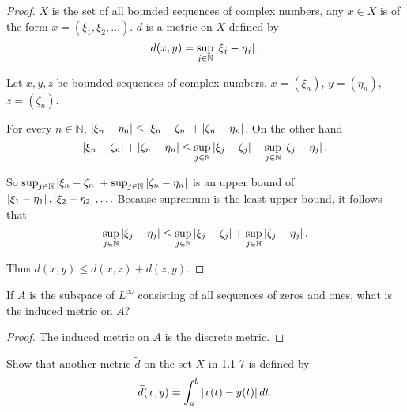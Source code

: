 \begin{proof}
    $X$ is the set of all bounded sequences of complex numbers, any $x\in X$ is of the form $x = (\xi_{1}, \xi_{2}, \ldots)$. $d$ is a metric on $X$ defined by
    \[
        d(x, y) = \sup_{j\in\mathbb{N}}\left\vert{\xi_{j} - \eta_{j}}\right\vert.
    \]

    Let $x, y, z$ be bounded sequences of complex numbers. $x = {(\xi_{n})}$, $y = {(\eta_{n})}$, $z = (\zeta_{n})$.

    For every $n\in\mathbb{N}$, $\left\vert{\xi_{n} - \eta_{n}}\right\vert\leq \left\vert{\xi_{n} - \zeta_{n}}\right\vert + \left\vert{\zeta_{n} - \eta_{n}}\right\vert$. On the other hand
    \[
        \left\vert{\xi_{n} - \zeta_{n}}\right\vert + \left\vert{\zeta_{n} - \eta_{n}}\right\vert \leq \sup_{j\in\mathbb{N}}\left\vert{\xi_{j} - \zeta_{j}}\right\vert + \sup_{j\in\mathbb{N}}\left\vert{\zeta_{j} - \eta_{j}}\right\vert.
    \]

    So $\sup_{j\in\mathbb{N}}\left\vert{\xi_{n} - \zeta_{n}}\right\vert + \sup_{j\in\mathbb{N}}\left\vert{\zeta_{n} - \eta_{n}}\right\vert$ is an upper bound of $\left\vert{\xi_{1} - \eta_{1}}\right\vert, \left\vert{\xi_{2} - \eta_{2}}\right\vert, \ldots$ Because supremum is the least upper bound, it follows that
    \[
        \sup_{j\in\mathbb{N}}\left\vert{\xi_{j} - \eta_{j}}\right\vert \leq \sup_{j\in\mathbb{N}}\left\vert{\xi_{j} - \zeta_{j}}\right\vert + \sup_{j\in\mathbb{N}}\left\vert{\zeta_{j} - \eta_{j}}\right\vert.
    \]

    Thus $d(x, y)\leq d(x, z) + d(z, y)$.
\end{proof}

\begin{exercise}\label{chapter1:section1:exercise7}
    If $A$ is the subspace of $L^{\infty}$ consisting of all sequences of zeros and ones, what is the induced metric on $A$?
\end{exercise}

\begin{proof}
    The induced metric on $A$ is the discrete metric.
\end{proof}

\begin{exercise}\label{chapter1:section1:exercise8}
    Show that another metric $\widetilde{d}$ on the set $X$ in 1.1-7 is defined by
    \[
        \widetilde{d}(x, y) = \int^{b}_{a}\left\vert{x(t) - y(t)}\right\vert dt.
    \]
\end{exercise}

